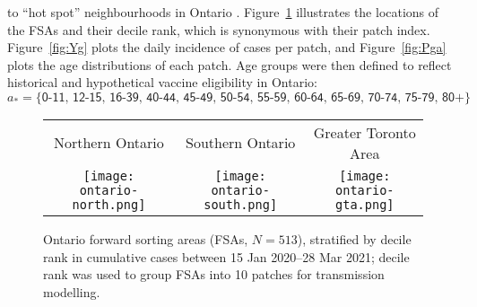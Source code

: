to ``hot spot'' neighbourhoods in Ontario \cite{Mishra2021,Brown2021}.
Figure~\ref{fig:map} illustrates the locations of the FSAs and their decile rank,
which is synonymous with their patch index.
Figure~\ref{fig:Yg} plots the daily incidence of \covid cases per patch, and
Figure~\ref{fig:Pga} plots the age distributions of each patch.
Age groups were then defined to reflect historical and hypothetical \covid vaccine eligibility in Ontario:
\begin{equation}
  a_* = \big\{\textsf{0-11, 12-15, 16-39, 40-44, 45-49, 50-54, 55-59, 60-64, 65-69, 70-74, 75-79, 80+}\big\}
\end{equation}
\begin{figure}
  \centering
  \setlength{\tabcolsep}{0pt}
  \begin{tabular}{ccc}
    Northern Ontario & Southern Ontario & Greater Toronto Area\\
    \texttt{[image: ontario-north.png]} &
    \texttt{[image: ontario-south.png]} &
    \texttt{[image: ontario-gta.png]}
  \end{tabular}
  \caption{Ontario forward sorting areas (FSAs, $N=513$),
    stratified by decile rank in cumulative \covid cases between 15 Jan 2020--28 Mar 2021;
    decile rank was used to group FSAs into 10 patches for transmission modelling.}
  \label{fig:map}
\end{figure}
